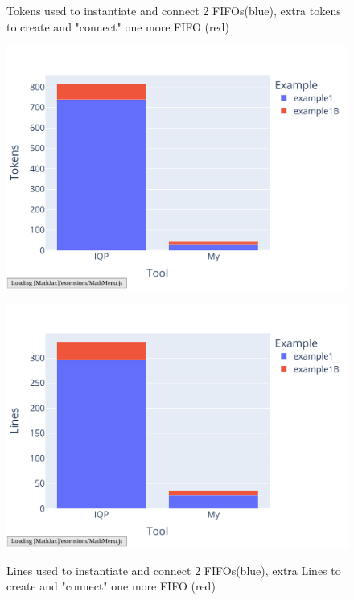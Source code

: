 \documentclass[12pt]{report}
\begin{document}
\begin{figure}[H] 
\begin{minipage}{.45\textwidth} 
   \caption{Tokens used to instantiate and connect 2 FIFOs(blue), extra tokens to create and "connect" one more FIFO (red)} 
   \includegraphics[width=\textwidth]{charts/example1_tokens.pdf} 
   \label{fig:sub1} 
   \centering 
\end{minipage}%
\hspace{0.5cm} 
\begin{minipage}{.45\textwidth} 
   \caption{Lines used to instantiate and connect 2 FIFOs(blue), extra Lines to create and "connect" one more FIFO (red)} 
   \includegraphics[width=\textwidth]{charts/example1_lines.pdf} 
   \label{fig:sub2} 
   \centering 
\end{minipage} 
\end{figure} 
\end{document}
